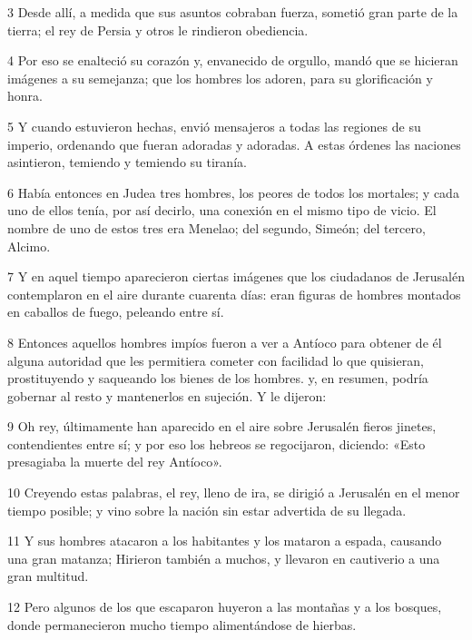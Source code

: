 \par 3 Desde allí, a medida que sus asuntos cobraban fuerza, sometió gran parte de la tierra; el rey de Persia y otros le rindieron obediencia.

\par 4 Por eso se enalteció su corazón y, envanecido de orgullo, mandó que se hicieran imágenes a su semejanza; que los hombres los adoren, para su glorificación y honra.

\par 5 Y cuando estuvieron hechas, envió mensajeros a todas las regiones de su imperio, ordenando que fueran adoradas y adoradas. A estas órdenes las naciones asintieron, temiendo y temiendo su tiranía.

\par 6 Había entonces en Judea tres hombres, los peores de todos los mortales; y cada uno de ellos tenía, por así decirlo, una conexión en el mismo tipo de vicio. El nombre de uno de estos tres era Menelao; del segundo, Simeón; del tercero, Alcimo.

\par 7 Y en aquel tiempo aparecieron ciertas imágenes que los ciudadanos de Jerusalén contemplaron en el aire durante cuarenta días: eran figuras de hombres montados en caballos de fuego, peleando entre sí.

\par 8 Entonces aquellos hombres impíos fueron a ver a Antíoco para obtener de él alguna autoridad que les permitiera cometer con facilidad lo que quisieran, prostituyendo y saqueando los bienes de los hombres. y, en resumen, podría gobernar al resto y mantenerlos en sujeción. Y le dijeron:

\par 9 Oh rey, últimamente han aparecido en el aire sobre Jerusalén fieros jinetes, contendientes entre sí; y por eso los hebreos se regocijaron, diciendo: «Esto presagiaba la muerte del rey Antíoco».

\par 10 Creyendo estas palabras, el rey, lleno de ira, se dirigió a Jerusalén en el menor tiempo posible; y vino sobre la nación sin estar advertida de su llegada.

\par 11 Y sus hombres atacaron a los habitantes y los mataron a espada, causando una gran matanza; Hirieron también a muchos, y llevaron en cautiverio a una gran multitud.

\par 12 Pero algunos de los que escaparon huyeron a las montañas y a los bosques, donde permanecieron mucho tiempo alimentándose de hierbas.

